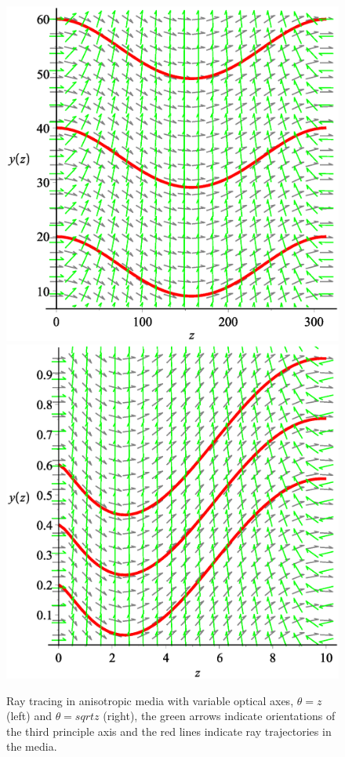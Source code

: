 \documentclass[9pt,twocolumn,twoside]{osajnl}
\begin{document}
\begin{figure}[htbp]
\centering
\includegraphics[scale=0.2]{Visualization4}
\includegraphics[scale=0.2]{Visualization3}
\caption{Ray tracing in anisotropic media with variable optical axes, $\theta=z$ (left) and $\theta=sqrt{z}$ (right), the  green arrows  indicate orientations of the third principle axis and the red lines  indicate ray trajectories  in the media.}
\label{curvedspace2}
\end{figure}
\end{document}

